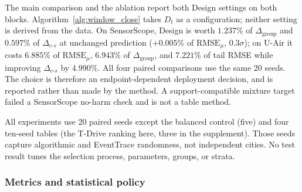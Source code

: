 \documentclass[letterpaper,journal]{IEEEtran}
\begin{document}
The main comparison and the ablation report both Design settings on both
blocks.  Algorithm~\ref{alg:window_close} takes $D_t$ as a configuration;
neither setting is derived from the data.  On SensorScope, Design is worth
$1.237\%$ of $\Delta_{\mathrm{group}}$ and $0.597\%$ of
$\Delta_{c\text{-}s}$ at unchanged prediction ($+0.005\%$ of
$\mathrm{RMSE}_{\mu}$, $0.3\sigma$); on U-Air it costs $6.885\%$ of
$\mathrm{RMSE}_{\mu}$, $6.943\%$ of $\Delta_{\mathrm{group}}$, and $7.221\%$
of tail RMSE while improving $\Delta_{c\text{-}s}$ by $4.990\%$.  All four
paired comparisons use the same 20 seeds.  The choice is therefore an
endpoint-dependent deployment decision, and is reported rather than made by
the method.  A support-compatible mixture target failed a
SensorScope no-harm check and is not a table method.

All experiments use 20 paired seeds except the balanced control (five) and four ten-seed tables (the T-Drive
ranking here, three in the supplement).  Those seeds capture algorithmic and EventTrace randomness, not independent
cities.  No test result tunes the selection process, parameters, groups, or strata.

\subsubsection{Metrics and statistical policy}
\end{document}
